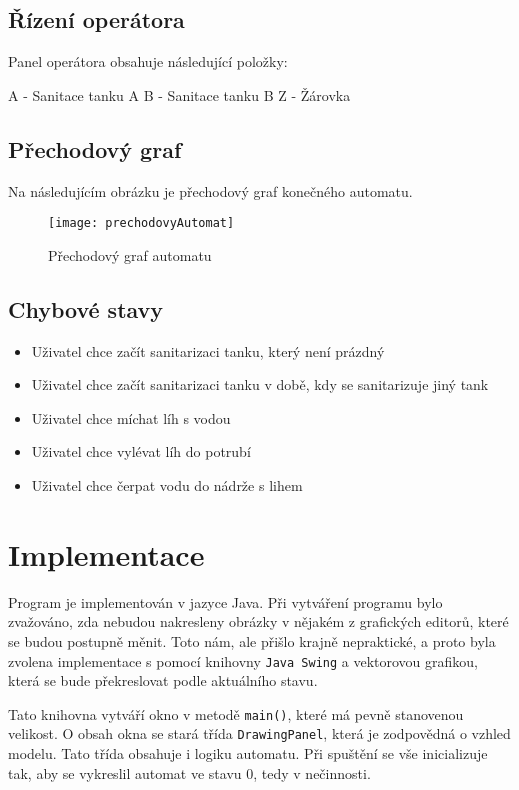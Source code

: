 \documentclass[12pt, a4paper]{article}
\begin{document}
\subsection{Řízení operátora}
Panel operátora obsahuje následující položky:

A - Sanitace tanku A \newline 
B - Sanitace tanku B \newline 
Z - Žárovka

\subsection{Přechodový graf}
Na následujícím obrázku je přechodový graf konečného automatu.
\begin{figure}[h]
\centering 
\texttt{[image: prechodovyAutomat]}
\caption{Přechodový graf automatu}
\end{figure}

\subsection{Chybové stavy} \label{chyba}
\begin{itemize}
  \item Uživatel chce začít sanitarizaci tanku, který není prázdný
  \item Uživatel chce začít sanitarizaci tanku v době, kdy se sanitarizuje jiný tank
  \item Uživatel chce míchat líh s vodou
  \item Uživatel chce vylévat líh do potrubí
  \item Uživatel chce čerpat vodu do nádrže s lihem
\end{itemize}

\section{Implementace}
Program je implementován v jazyce Java. Při vytváření programu bylo zvažováno, zda nebudou nakresleny obrázky v nějakém z grafických editorů, které se budou postupně měnit. Toto nám, ale přišlo krajně nepraktické, a proto byla zvolena implementace s pomocí knihovny \texttt{Java Swing} a vektorovou grafikou, která se bude překreslovat podle aktuálního stavu. 

\vspace{0.25cm}
Tato knihovna vytváří okno v metodě \texttt{main()}, které má pevně stanovenou velikost. O obsah okna se stará třída \texttt{DrawingPanel}, která je zodpovědná o vzhled modelu. Tato třída obsahuje i logiku automatu. Při spuštění se vše inicializuje tak, aby se vykreslil automat ve stavu 0, tedy v nečinnosti.
\end{document}
